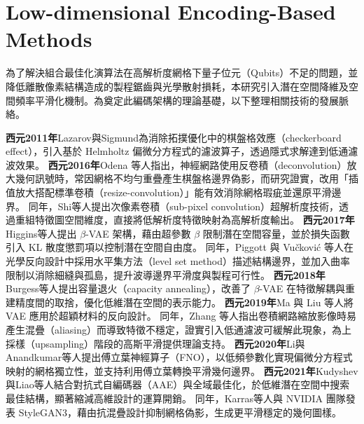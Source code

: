 \section{Low-dimensional Encoding-Based Methods}

為了解決組合最佳化演算法在高解析度網格下量子位元（Qubits）不足的問題，並降低離散像素結構造成的製程鋸齒與光學散射損耗，本研究引入潛在空間降維及空間頻率平滑化機制。為奠定此編碼架構的理論基礎，以下整理相關技術的發展脈絡。\

\cite{lazarov2011_filters}\textbf{西元2011年}Lazarov與Sigmund為消除拓撲優化中的棋盤格效應（checkerboard effect），引入基於 Helmholtz 偏微分方程式的濾波算子，透過隱式求解達到低通濾波效果。
\cite{odena2016_deconvolution}\textbf{西元2016年}Odena 等人指出，神經網路使用反卷積（deconvolution）放大幾何訊號時，常因網格不均勻重疊產生棋盤格邊界偽影，而研究證實，改用「插值放大搭配標準卷積（resize-convolution）」能有效消除網格瑕疵並還原平滑邊界。
同年，\cite{shi2016_subpixel_cnn}Shi等人提出次像素卷積（sub-pixel convolution）超解析度技術，透過重組特徵圖空間維度，直接將低解析度特徵映射為高解析度輸出。
\textbf{西元2017年}\cite{higgins2017_betavae}Higgins等人提出 $\beta$-VAE 架構，藉由超參數 $\beta$ 限制潛在空間容量，並於損失函數引入 KL 散度懲罰項以控制潛在空間自由度。
同年，\cite{piggott2017_fabrication}Piggott 與 Vučković 等人在光學反向設計中採用水平集方法（level set method）描述結構邊界，並加入曲率限制以消除細縫與孤島，提升波導邊界平滑度與製程可行性。
\textbf{西元2018年}\cite{burgess2018_understanding_betavae}Burgess等人提出容量退火（capacity annealing），改善了 $\beta$-VAE 在特徵解耦與重建精度間的取捨，優化低維潛在空間的表示能力。
\textbf{西元2019年}\cite{ma2019_probabilistic}Ma 與 Liu 等人將 VAE 應用於超穎材料的反向設計。
同年，\cite{zhang2019_shift_invariant}Zhang 等人指出卷積網路縮放影像時易產生混疊（aliasing）而導致特徵不穩定，證實引入低通濾波可緩解此現象，為上採樣（upsampling）階段的高斯平滑提供理論支持。
\textbf{西元2020年}\cite{li2020_fourier_neural_operator}Li與Anandkumar等人提出傅立葉神經算子（FNO），以低頻參數化實現偏微分方程式映射的網格獨立性，並支持利用傅立葉轉換平滑幾何邊界。
\textbf{西元2021年}\cite{kudyshev2021_machine_learning}Kudyshev與Liao等人結合對抗式自編碼器（AAE）與全域最佳化，於低維潛在空間中搜索最佳結構，顯著縮減高維設計的運算開銷。
同年，\cite{karras2021_alias_free}Karras等人與 NVIDIA 團隊發表 StyleGAN3，藉由抗混疊設計抑制網格偽影，生成更平滑穩定的幾何圖樣。


